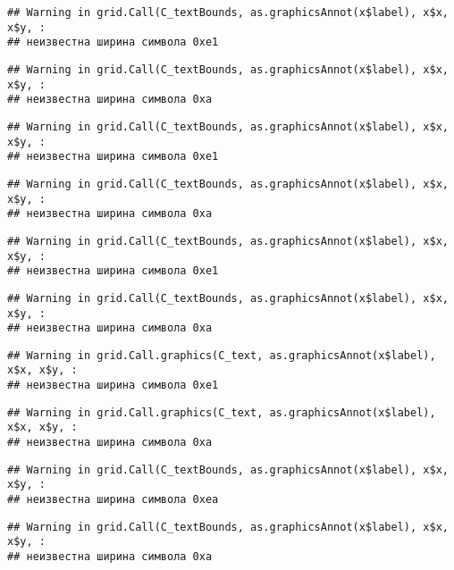 \documentclass[
]{article}
\begin{document}
\begin{verbatim}
## Warning in grid.Call(C_textBounds, as.graphicsAnnot(x$label), x$x, x$y, :
## неизвестна ширина символа 0xe1
\end{verbatim}

\begin{verbatim}
## Warning in grid.Call(C_textBounds, as.graphicsAnnot(x$label), x$x, x$y, :
## неизвестна ширина символа 0xa
\end{verbatim}

\begin{verbatim}
## Warning in grid.Call(C_textBounds, as.graphicsAnnot(x$label), x$x, x$y, :
## неизвестна ширина символа 0xe1
\end{verbatim}

\begin{verbatim}
## Warning in grid.Call(C_textBounds, as.graphicsAnnot(x$label), x$x, x$y, :
## неизвестна ширина символа 0xa
\end{verbatim}

\begin{verbatim}
## Warning in grid.Call(C_textBounds, as.graphicsAnnot(x$label), x$x, x$y, :
## неизвестна ширина символа 0xe1
\end{verbatim}

\begin{verbatim}
## Warning in grid.Call(C_textBounds, as.graphicsAnnot(x$label), x$x, x$y, :
## неизвестна ширина символа 0xa
\end{verbatim}

\begin{verbatim}
## Warning in grid.Call.graphics(C_text, as.graphicsAnnot(x$label), x$x, x$y, :
## неизвестна ширина символа 0xe1
\end{verbatim}

\begin{verbatim}
## Warning in grid.Call.graphics(C_text, as.graphicsAnnot(x$label), x$x, x$y, :
## неизвестна ширина символа 0xa
\end{verbatim}

\begin{verbatim}
## Warning in grid.Call(C_textBounds, as.graphicsAnnot(x$label), x$x, x$y, :
## неизвестна ширина символа 0xea
\end{verbatim}

\begin{verbatim}
## Warning in grid.Call(C_textBounds, as.graphicsAnnot(x$label), x$x, x$y, :
## неизвестна ширина символа 0xa
\end{verbatim}
\end{document}
